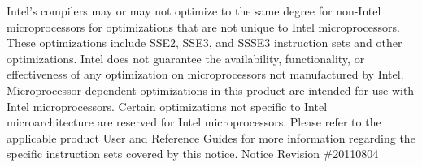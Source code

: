\begin{framed}
\noindent Intel's compilers may or may not optimize to the same degree for non-Intel microprocessors for optimizations that are not unique to Intel microprocessors. These optimizations include SSE2, SSE3, and SSSE3 instruction sets and other optimizations. Intel does not guarantee the availability, functionality, or effectiveness of any optimization on microprocessors not manufactured by Intel. Microprocessor-dependent optimizations in this product are intended for use with Intel microprocessors. Certain optimizations not specific to Intel microarchitecture are reserved for Intel microprocessors. Please refer to the applicable product User and Reference Guides for more information regarding the specific instruction sets covered by this notice.  Notice Revision \#20110804
\end{framed}
